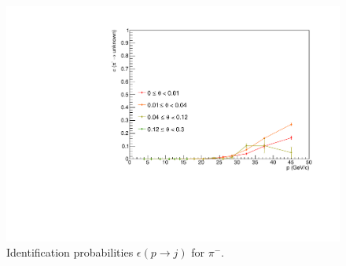 \begin{figure}[!p]
  \includegraphics[scale=0.38]{./gfx/pim_u.pdf}
	\caption{Identification probabilities $\epsilon(p \rightarrow j)$ for $\pi^-$.}
	\label{pic:Effpim}
\end{figure}


